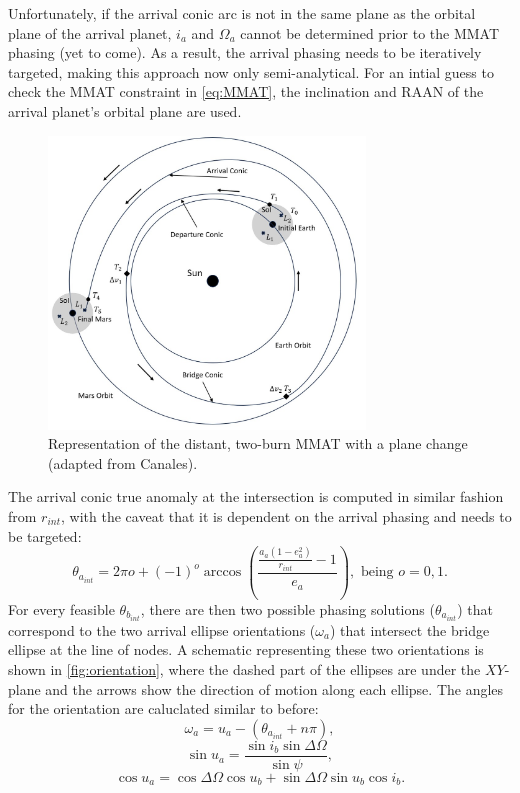 Unfortunately, if the arrival conic arc is not in the same plane as the orbital plane of the
arrival planet, $i_{a}$ and $\Omega_{a}$ cannot be determined prior to the MMAT phasing (yet to
come). As a result, the arrival phasing needs to be iteratively targeted, making this approach now
only semi-analytical. For an intial guess to check the MMAT constraint in \cref{eq:MMAT}, the
inclination and RAAN of the arrival planet's orbital plane are used.

\begin{figure}[ht]
    \centering
    \includegraphics[width=0.75\textwidth]{figures/MMAT.jpg}
    \caption{Representation of the distant, two-burn MMAT with a plane change (adapted from Canales\cite{Canales:2021b}).}
    \label{fig:MMAT}
\end{figure}

The arrival conic true anomaly at the intersection is computed in similar fashion from $r_{int}$,
with the caveat that it is dependent on the arrival phasing and needs to be targeted:
\begin{equation}
    \theta_{a_{int}}=2\pi o+(-1)^{o}\arccos(\frac{\frac{a_{a}(1-e_{a}^{2})}{r_{int}}-1}{e_{a}}),\text{ being }o=0,1.
    \label{eq:arrivalintersect}
\end{equation}
For every feasible $\theta_{b_{int}}$, there are then two possible phasing solutions
($\theta_{a_{int}}$) that correspond to the two arrival ellipse orientations ($\omega_{a}$) that
intersect the bridge ellipse at the line of nodes. A schematic representing these two orientations
is shown in \cref{fig:orientation}, where the dashed part of the ellipses are under the $XY$-plane
and the arrows show the direction of motion along each ellipse. The angles for the orientation are
caluclated similar to before:
\begin{equation}
    \omega_{a}=u_{a}-(\theta_{a_{int}}+n\pi),
    \label{eq:arrivalperiapse}
\end{equation}
\begin{equation}
    \sin u_{a}=\frac{\sin i_{b}\sin\Delta\Omega}{\sin\psi},
    \label{eq:arrivalsinu}
\end{equation}
\begin{equation}
    \cos u_{a}=\cos\Delta\Omega\cos u_{b}+\sin\Delta\Omega\sin u_{b}\cos i_{b}.
    \label{eq:arrivalcosu}
\end{equation}

